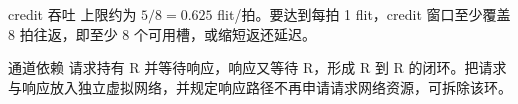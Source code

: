 \begin{chapteranswer}{credit 吞吐}
上限约为 $5/8=0.625$ flit/拍。要达到每拍 1 flit，credit 窗口至少覆盖 8 拍往返，即至少 8 个可用槽，或缩短返还延迟。
\end{chapteranswer}

\begin{chapteranswer}{通道依赖}
请求持有 R 并等待响应，响应又等待 R，形成 R 到 R 的闭环。把请求与响应放入独立虚拟网络，并规定响应路径不再申请请求网络资源，可拆除该环。
\end{chapteranswer}
